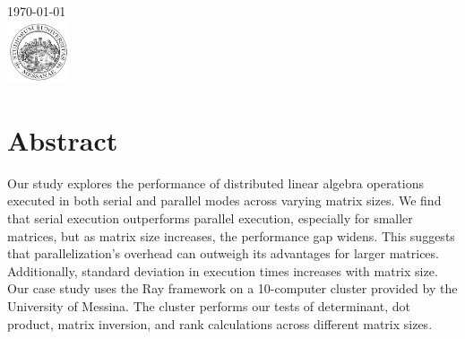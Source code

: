 \begin{titlepage}


    {\large \today}\\[2cm] %


    \includegraphics[width=70px, keepaspectratio]{unime.png}\\[1cm] %


    \vfill %

\end{titlepage}

\tableofcontents
\pagebreak

\section{Abstract}
Our study explores the performance of distributed linear algebra operations executed in both serial and parallel modes across varying matrix sizes. We find that serial execution outperforms parallel execution, especially for smaller matrices, but as matrix size increases, the performance gap widens. This suggests that parallelization's overhead can outweigh its advantages for larger matrices. Additionally, standard deviation in execution times increases with matrix size. Our case study uses the Ray framework on a 10-computer cluster provided by the University of Messina. The cluster performs our tests of determinant, dot product, matrix inversion, and rank calculations across different matrix sizes.

